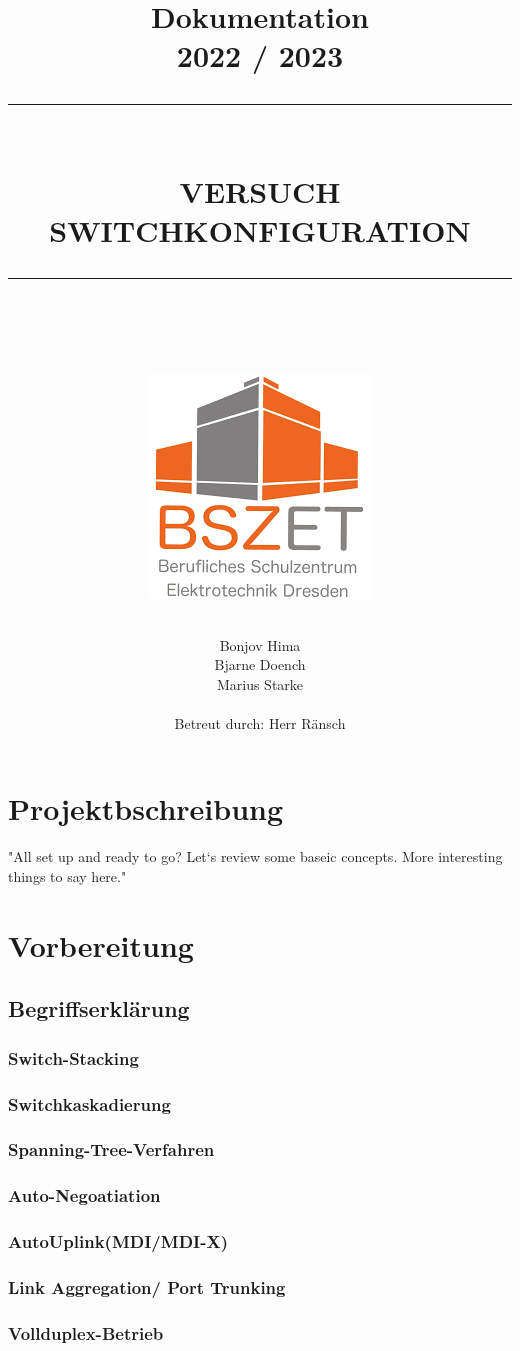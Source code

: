 \documentclass[a4paper, 11pt]{scrartcl}
\title{ \normalsize \textbf{Dokumentation}
    \\2022 / 2023
    \leavevmode\\ [2.0cm]
    \hrule
    \leavevmode\\ [0.5cm]
    \LARGE \textbf{\uppercase{Versuch Switchkonfiguration}}
    \leavevmode\\ [1cm] 
    \hrule
    \leavevmode\\ [2cm] 
    \begin{center}
    \includegraphics[scale=0.6]{bszet-lgo.png}
    \end{center}
	\normalsize  \vspace*{4.7\baselineskip}
    }
\date{}
\author{
    Bonjov Hima \\
    Bjarne Doench \\
    Marius Starke \\ \\
    Betreut durch: Herr Ränsch}
\begin{document}
    \maketitle

    \newpage
    \setcounter{page}{1}

    \tableofcontents
    \thispagestyle{scrheadings}
    \newpage

    \section{Projektbschreibung}

    "All set up and ready to go? Let`s review some baseic concepts.
    More interesting things to say here." \cite*{testbuch1}
    \newpage
    \section{Vorbereitung}
    \subsection{Begriffserklärung}
    \subsubsection{Switch-Stacking}
    \subsubsection{Switchkaskadierung}
    \subsubsection{Spanning-Tree-Verfahren}
    \subsubsection{Auto-Negoatiation}
    \subsubsection{AutoUplink(MDI/MDI-X)}
    \subsubsection{Link Aggregation/ Port Trunking}
    \subsubsection{Vollduplex-Betrieb}
\end{document}
